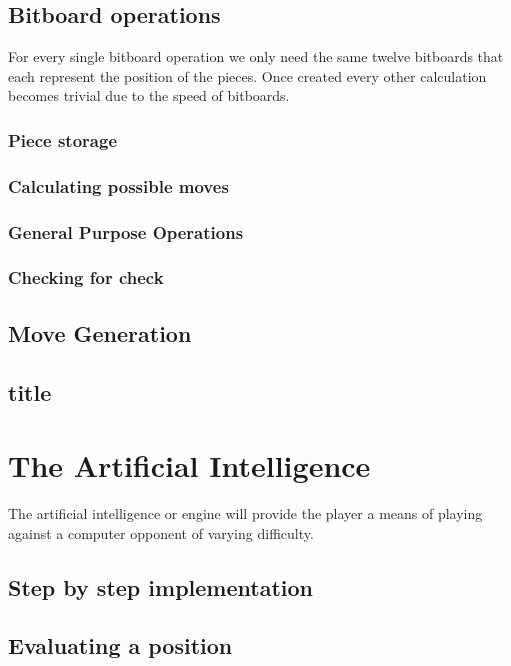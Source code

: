 \documentclass[11pt]{report}
\begin{document}
\section{Bitboard operations}

For every single bitboard operation we only need the same twelve bitboards that each represent the position of the pieces. Once created every other calculation becomes trivial due to the speed of bitboards.

\subsection{Piece storage}
\subsection{Calculating possible moves}
\subsection{General Purpose Operations}
\subsection{Checking for check}

\section{Move Generation}

\section{title}


\chapter{The Artificial Intelligence}

The artificial intelligence or engine will provide the player a means of playing against a computer opponent of varying difficulty.

\section{Step by step implementation}

\section{Evaluating a position}
\end{document}
